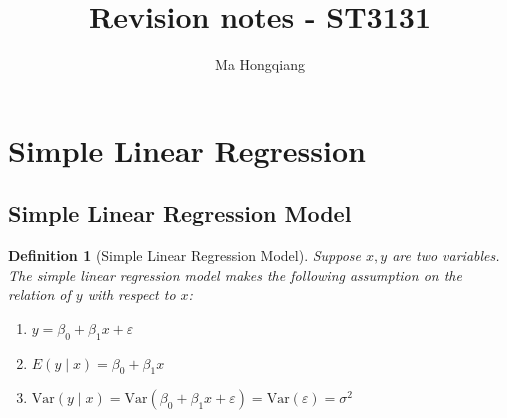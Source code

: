 \documentclass[11pt]{article}
\newcommand{\var}{\mathrm{Var}}
\newtheorem{definition}{Definition}[section]
\theoremstyle{definition}
\begin{document}
\title{Revision notes - ST3131}
\author{Ma Hongqiang}
\maketitle
\tableofcontents

\clearpage
\twocolumn
\section{Simple Linear Regression}
\subsection{Simple Linear Regression Model}
\begin{definition}[Simple Linear Regression Model]
\normalfont Suppose $x, y$ are two variables. The simple linear regression model makes the following assumption on the relation of $y$ with respect to $x$:
\begin{enumerate}
  \item $y=\beta_0+\beta_1x+\varepsilon$
  \item $E(y\mid x) = \beta_0+\beta_1x$
  \item $\var(y\mid x) = \var(\beta_0+\beta_1x+\varepsilon) = \var(\varepsilon) = \sigma^2$
\end{enumerate}
\end{definition}
\end{document}
